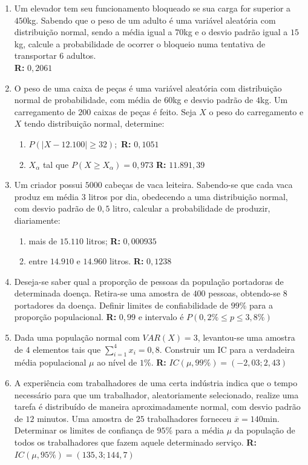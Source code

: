 \documentclass[oneside,a4paper,12pt]{article}
\begin{document}
\begin{enumerate}
	\item Um elevador tem seu funcionamento bloqueado se sua carga for superior a $450$kg. Sabendo que o peso de um adulto é uma variável aleatória com distribuição normal, sendo a média igual a $70$kg e o desvio padrão igual a $15$kg, calcule a probabilidade de ocorrer o bloqueio numa tentativa de transportar $6$ adultos.
	\\{\bf R: } $0,2061$
	
	\item O peso de uma caixa de peças é uma variável aleatória com distribuição normal de probabilidade, com média de $60$kg e desvio padrão de $4$kg. Um carregamento de $200$ caixas de peças é feito. Seja $X$ o peso do carregamento e $X$ tendo distribuição normal, determine:
	\begin{enumerate}
		\item $P(|X - 12.100|\geq32);$ {\bf R: } $0,1051$
		\item $X_{\alpha}$ tal que $P(X \geq X_{\alpha}) = 0,973$ {\bf R: } $11.891,39$
	\end{enumerate}

	\item Um criador possui $5000$ cabeças de vaca leiteira. Sabendo-se que cada vaca produz em média $3$ litros por dia, obedecendo a uma distribuição normal, com desvio padrão de $0,5$ litro, calcular a probabilidade de produzir, diariamente:
	\begin{enumerate}
		\item mais de $15.110$ litros; {\bf R: } $0,000935$
		\item entre $14.910$ e $14.960$ litros. {\bf R: } $0,1238$
	\end{enumerate}

	\item Deseja-se saber qual a proporção de pessoas da população portadoras de determinada doença. Retira-se uma amostra de $400$ pessoas, obtendo-se $8$ portadores da doença. Definir limites de confiabilidade de $99$\% para a proporção populacional. {\bf R: }$0,99$ e intervalo é $P(0,2\%\leq p \leq 3,8\%)$

	\item Dada uma população normal com $VAR(X) = 3$, levantou-se uma amostra de $4$ elementos tais que $\displaystyle \sum_{i = 1}^{4}x_i = 0,8$. Construir um IC para a verdadeira média populacional $\mu$ ao nível de $1$\%. {\bf R: } $IC(\mu,99\%) = (-2,03;2,43)$

	\item A experiência com trabalhadores de uma certa indústria indica que o tempo necessário para que um trabalhador, aleatoriamente selecionado, realize uma tarefa é distribuído de maneira aproximadamente normal, com desvio padrão de $12$ minutos. Uma amostra de $25$ trabalhadores forneceu $\overline{x} = 140$min. Determinar os limites de confiança de $95$\% para a média $\mu$ da população de todos os trabalhadores que fazem aquele determinado serviço. {\bf R: } $IC(\mu,95\%) = (135,3;144,7)$
	

\end{enumerate}
\end{document}
